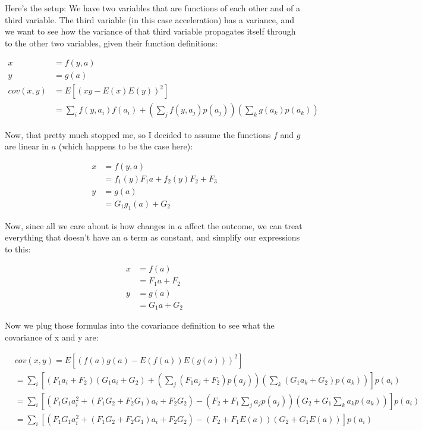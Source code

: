 \documentclass[12pt]{article}
\begin{document}
Here's the setup: We have two variables that are functions of each other and of
a third variable. The third variable (in this case acceleration) has a variance,
and we want to see how the variance of that third variable propagates itself
through to the other two variables, given their function definitions:

\begin{align}
  x &= f(y,a)\\
  y &= g(a) \\
  cov(x,y) &= E[(x y - E(x)E(y))^2] \\
           &= \sum_i f(y,a_i)f(a_i) + \left(\sum_j f(y,a_j)p(a_j)\right)\left(\sum_k g(a_k)p(a_k)\right)
\end{align}

Now, that pretty much stopped me, so I decided to assume the functions $f$ and
$g$ are linear in $a$ (which happens to be the case here):

\begin{align}
  x &= f(y,a)\\
    &= f_1(y)F_1a + f_2(y)F_2 + F_3\\
  y &= g(a) \\
    &= G_1g_1(a) + G_2 
\end{align}

Now, since all we care about is how changes in $a$ affect the outcome, we can
treat everything that doesn't have an $a$ term as constant, and simplify our
expressions to this:

\begin{align}
  x &= f(a)\\
    &= F_1 a + F_2\\
  y &= g(a) \\
    &= G_1 a + G_2
\end{align}

Now we plug those formulas into the covariance definition to see what the
covariance of x and y are:

\begin{align}
  & cov(x,y) =  E\left[\left(f(a)g(a) -
  E\left(f(a)\right)E\left(g(a)\right)\right)^2\right] \\
           &= \sum_i \left[\left(F_1 a_i + F_2\right)\left(G_1 a_i + G_2 \right) +
  \left(\sum_j (F_1 a_j+ F_2) p(a_j)\right)
\left(\sum_k (G_1 a_k + G_2) p(a_k)\right)\right]p(a_i)\\
&= \sum_i \left[\left(F_1 G_1 a_i^2 + (F_1 G_2 + F_2 G_1)a_i + F_2 G_2\right) -
\left(F_2 + F_1 \sum_j a_j p(a_j)\right)\left(G_2 + G_1\sum_k a_k
p(a_k)\right)\right]p(a_i)\\
&= \sum_i \left[\left (F_1 G_1 a_i^2 + (F_1 G_2 + F_2 G_1)a_i+F_2 G_2\right) -
\left(F_2 + F_1 E(a)\right)\left(G_2+G_1 E(a)\right)\right]p(a_i)
\end{align}
\end{document}
